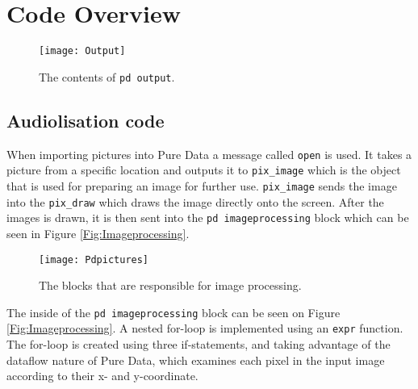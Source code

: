 \chapter{Code Overview}\label{ch:codeoverview}


\begin{figure}
\centering
\texttt{[image: Output]}
\caption{The contents of \texttt{pd output}.}
\label{Fig:Output}
\end{figure}

\section{Audiolisation code}
When importing pictures into Pure Data a message called \texttt{open} is used. It takes a picture from a specific location and outputs it to \texttt{pix\_image} which is the object that is used for preparing an image for further use. \texttt{pix\_image} sends the image into the \texttt{pix\_draw} which draws the image directly onto the screen. After the images is drawn, it is then sent into the \texttt{pd imageprocessing} block which can be seen in Figure \ref{Fig:Imageprocessing}.

\begin{figure}
\centering
\texttt{[image: Pdpictures]}
\caption{The blocks that are responsible for image processing.}
\label{Fig:pdpicture}
\end{figure}

The inside of the \texttt{pd imageprocessing} block can be seen on Figure \ref{Fig:Imageprocessing}. A nested for-loop is implemented using an \texttt{expr} function. The for-loop is created using three if-statements, and taking advantage of the dataflow nature of Pure Data, which examines each pixel in the input image according to their x- and y-coordinate.



